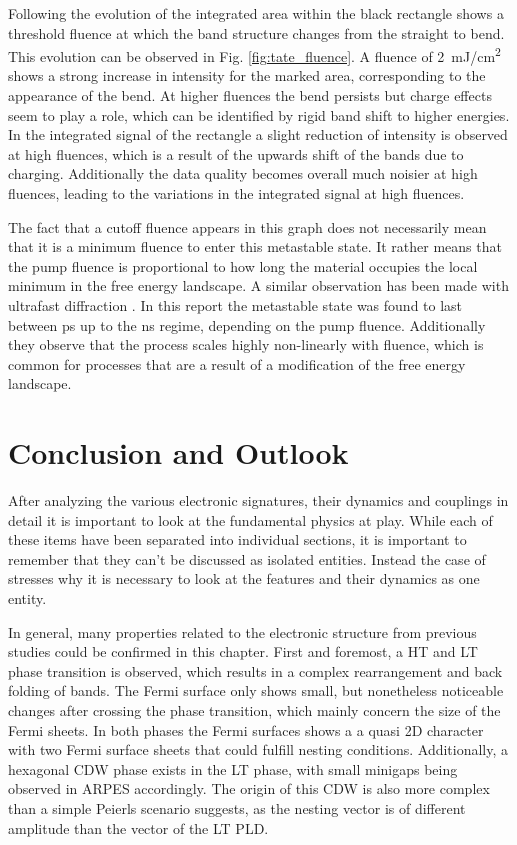 Following the evolution of the integrated area within the black rectangle shows a threshold fluence at which the band structure changes from the straight to bend.
This evolution can be observed in Fig. \ref{fig:tate_fluence}.
A fluence of \qty{2}{\milli\joule/\centi\meter\squared} shows a strong increase in intensity for the marked area, corresponding to the appearance of the bend.
At higher fluences the bend persists but charge effects seem to play a role, which can be identified by rigid band shift to higher energies.
In the integrated signal of the rectangle a slight reduction of intensity is observed at high fluences, which is a result of the upwards shift of the bands due to charging.
Additionally the data quality becomes overall much noisier at high fluences, leading to the variations in the integrated signal at high fluences.

The fact that a cutoff fluence appears in this graph does not necessarily mean that it is a minimum fluence to enter this metastable state.
It rather means that the pump fluence is proportional to how long the material occupies the local minimum in the free energy landscape.
A similar observation has been made with ultrafast diffraction \cite{domrose_femtosecond_2024}.
In this report the metastable state was found to last between \unit{\pico\second} up to the \unit{\nano\second} regime, depending on the pump fluence.
Additionally they observe that the process scales highly non-linearly with fluence, which is common for processes that are a result of a modification of the free energy landscape.

\section{Conclusion and Outlook}

After analyzing the various electronic signatures, their dynamics and couplings in detail it is important to look at the fundamental physics at play.
While each of these items have been separated into individual sections, it is important to remember that they can't be discussed as isolated entities.
Instead the case of  stresses why it is necessary to look at the features and their dynamics as one entity.

In general, many properties related to the electronic structure from previous studies could be confirmed in this chapter.
First and foremost, a HT and LT phase transition is observed, which results in a complex rearrangement and back folding of bands.
The Fermi surface only shows small, but nonetheless noticeable changes after crossing the phase transition, which mainly concern the size of the Fermi sheets.
In both phases the Fermi surfaces shows a a quasi 2D character with two Fermi surface sheets that could fulfill nesting conditions.
Additionally, a hexagonal CDW phase exists in the LT phase, with small minigaps being observed in ARPES accordingly.
The origin of  this CDW is also more complex than a simple Peierls scenario suggests, as the nesting vector is of different amplitude than the vector of the LT PLD.

